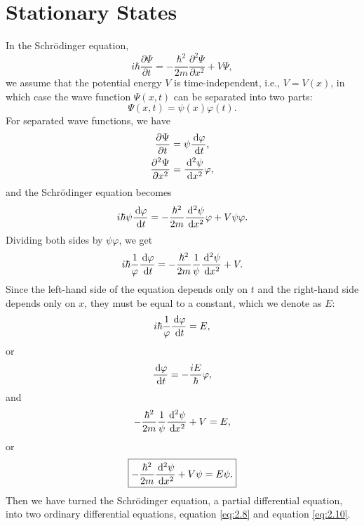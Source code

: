 \documentclass[en, oneside]{vivi}
\begin{document}
\section{Stationary States}
In the Schrödinger equation,
\begin{equation}
    i\hbar\frac{\partial \Psi}{\partial t} = -\frac{\hbar^2}{2m}\frac{\partial^2 \Psi}{\partial x^2} + V\Psi,
\end{equation}
we assume that the potential energy $V$ is time-independent, i.e., $V = V(x)$, in which case the wave function $\Psi(x, t)$ can be separated into two parts:
\begin{equation}
    \Psi(x, t) = \psi(x) \varphi(t).
\end{equation}
For separated wave functions, we have
\begin{align}
    \frac{\partial \Psi}{\partial t} &= \psi \frac{\dif \varphi}{\dif t}, \\
    \frac{\partial^2 \Psi}{\partial x^2} &= \frac{\dif[2] \psi}{\dif x^2} \varphi,
\end{align}
and the Schrödinger equation becomes
\begin{equation}
    i\hbar \psi \frac{\dif \varphi}{\dif t} = -\frac{\hbar^2}{2m} \frac{\dif[2] \psi}{\dif x^2} \varphi + V\psi\varphi.
\end{equation}
Dividing both sides by $\psi\varphi$, we get
\begin{equation}
    i\hbar \frac{1}{\varphi} \frac{\dif \varphi}{\dif t} = -\frac{\hbar^2}{2m} \frac{1}{\psi} \frac{\dif[2] \psi}{\dif x^2} + V.
\end{equation}
Since the left-hand side of the equation depends only on $t$ and the right-hand side depends only on $x$, they must be equal to a constant, which we denote as $E$:
\begin{equation}
    i\hbar \frac{1}{\varphi} \frac{\dif \varphi}{\dif t} = E,
\end{equation}
or
\begin{equation} \label{eq:2.8}
    \frac{\dif \varphi}{\dif t} = -\frac{iE}{\hbar} \varphi,
\end{equation}
and
\begin{equation}
    -\frac{\hbar^2}{2m} \frac{1}{\psi} \frac{\dif[2] \psi}{\dif x^2} + V = E,
\end{equation}
or
\begin{equation} \label{eq:2.10}
    \boxed{
        -\frac{\hbar^2}{2m} \frac{\dif[2] \psi}{\dif x^2} + V\psi = E\psi.
    }
\end{equation}
Then we have turned the Schrödinger equation, a partial differential equation, into two ordinary differential equations, equation \eqref{eq:2.8} and equation \eqref{eq:2.10}.\\
\end{document}
